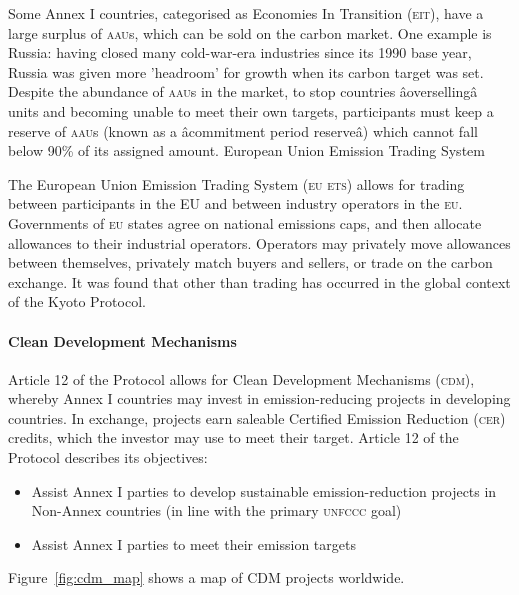 Some Annex I countries, categorised as Economies In Transition (\textsc{eit}), have a large surplus of \textsc{aau}s, which can be sold on the carbon market. One example is Russia: having closed many cold-war-era industries since its 1990 base year, Russia was given more 'headroom' for growth when its carbon target was set. Despite the abundance of \textsc{aau}s in the market, to stop countries âoversellingâ units and becoming unable to meet their own targets, participants must keep a reserve of \textsc{aau}s (known as a âcommitment period reserveâ) which cannot fall below 90\% of its assigned amount.
European Union Emission Trading System

The European Union Emission Trading System (\textsc{eu ets}) allows for trading between participants in the EU and between industry operators in the \textsc{eu}. Governments of \textsc{eu} states agree on national emissions caps, and then allocate allowances to their industrial operators. Operators may privately move allowances between themselves, privately match buyers and sellers, or trade on the carbon exchange. It was found that other than trading has occurred in the global context of the Kyoto Protocol.~\cite{Grubb-09}

\paragraph{Clean Development Mechanisms}

Article 12 of the Protocol allows for Clean Development Mechanisms (\textsc{cdm}), whereby Annex I countries may invest in emission-reducing projects in developing countries. In exchange, projects earn saleable Certified Emission Reduction (\textsc{cer}) credits, which the investor may use to meet their target. Article 12 of the Protocol describes its objectives:

\begin{itemize}
	\item Assist Annex I parties to develop sustainable emission-reduction projects in Non-Annex countries (in line with the primary \textsc{unfccc} goal)
	\item Assist Annex I parties to meet their emission targets
\end{itemize}

Figure~\ref{fig:cdm_map} shows a map of CDM projects worldwide.

